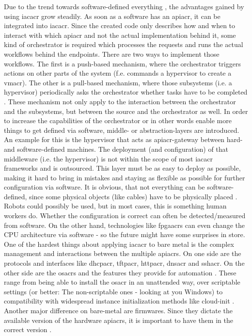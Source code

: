 Due to the trend towards software-defined everything \cite{sde_deloitte} \cite{sde_researchgate}, the advantages gained by using \gls{iacacr} grow steadily. As soon as a software has an \gls{apiacr}, it can be integrated into \gls{iacacr}. Since the created code only describes how and when to interact with which \gls{apiacr} and not the actual implementation behind it, some kind of orchestrator is required which processes the requests and runs the actual workflows behind the endpoints.
\newline
There are two ways to implement those workflows. The first is a push-based mechanism, where the orchestrator triggers actions on other parts of the system (f.e. commands a hypervisor to create a \gls{vmacr}). The other is a pull-based mechanism, where those subsystems (i.e. a hypervisor) periodically asks the orchestrator whether tasks have to be completed \cite{infoworld_puppet_chef_ansible_salt}.
\newline
These mechanism not only apply to the interaction between the orchestrator and the subsystems, but between the source and the orchestrator as well.
\newline
In order to increase the capabilities of the orchestrator or in other words enable more things to get defined via software, middle- or abstraction-layers are introduced. An example for this is the hypervisor that acts as \gls{apiacr}-gateway between hard- and software-defined machines. The deployment (and configuration) of that middleware (i.e. the hypervisor) is not within the scope of most \gls{iacacr} frameworks and is outsourced. This layer must be as easy to deploy as possible, making it hard to bring in mistakes and staying as flexible as possible for further configuration via software.
\newline
It is obvious, that not everything can be software-defined, since some physical objects (like cables) have to be physically placed \cite{iac_bare_metal}. Robots could possibly be used, but in most cases, this is something human workers do. Whether the configuration is correct can often be detected/measured from software. On the other hand, technologies like \gls{fpgaacr}s can even change the CPU architecture via software - so the future might have some surprises in store.
\newline
One of the hardest things about applying \gls{iacacr} to bare metal is the complex management and interactions between the multiple \gls{apiacr}s. On one side are the  protocols and interfaces like \gls{dhcpacr}, \gls{tftpacr}, \gls{httpacr}, \gls{dnsacr} and \gls{sshacr}. On the other side are the \gls{osacr}s and the features they provide for automation \cite{iac_bare_metal}.
These range from being able to install the \gls{osacr} in an unattended way, over scriptable settings (or better: The non-scriptable ones - looking at you Windows) to compatibility with widespread instance initialization methods like cloud-init \cite{cloudinit_docs}.
\newline
Another major difference on bare-metal are firmwares. Since they dictate the available version of the hardware \gls{apiacr}s, it is important to have them in the correct version \cite{iac_bare_metal}.

